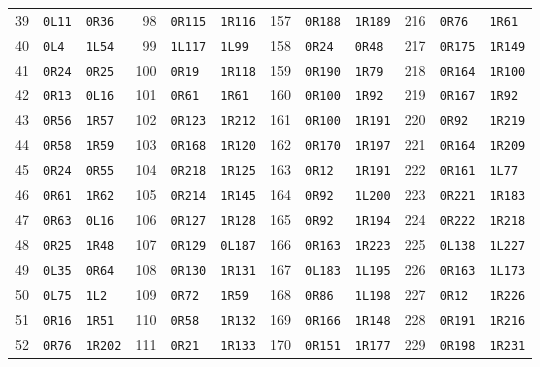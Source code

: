 \begin{longtable}{rllrllrllrll}
39 & \texttt{0L11} & \texttt{0R36} & 98 & \texttt{0R115} & \texttt{1R116} & 157 & \texttt{0R188} & \texttt{1R189} & 216 & \texttt{0R76} & \texttt{1R61}\\
40 & \texttt{0L4} & \texttt{1L54} & 99 & \texttt{1L117} & \texttt{1L99} & 158 & \texttt{0R24} & \texttt{0R48} & 217 & \texttt{0R175} & \texttt{1R149}\\
41 & \texttt{0R24} & \texttt{0R25} & 100 & \texttt{0R19} & \texttt{1R118} & 159 & \texttt{0R190} & \texttt{1R79} & 218 & \texttt{0R164} & \texttt{1R100}\\
42 & \texttt{0R13} & \texttt{0L16} & 101 & \texttt{0R61} & \texttt{1R61} & 160 & \texttt{0R100} & \texttt{1R92} & 219 & \texttt{0R167} & \texttt{1R92}\\
43 & \texttt{0R56} & \texttt{1R57} & 102 & \texttt{0R123} & \texttt{1R212} & 161 & \texttt{0R100} & \texttt{1R191} & 220 & \texttt{0R92} & \texttt{1R219}\\
44 & \texttt{0R58} & \texttt{1R59} & 103 & \texttt{0R168} & \texttt{1R120} & 162 & \texttt{0R170} & \texttt{1R197} & 221 & \texttt{0R164} & \texttt{1R209}\\
45 & \texttt{0R24} & \texttt{0R55} & 104 & \texttt{0R218} & \texttt{1R125} & 163 & \texttt{0R12} & \texttt{1R191} & 222 & \texttt{0R161} & \texttt{1L77}\\
46 & \texttt{0R61} & \texttt{1R62} & 105 & \texttt{0R214} & \texttt{1R145} & 164 & \texttt{0R92} & \texttt{1L200} & 223 & \texttt{0R221} & \texttt{1R183}\\
47 & \texttt{0R63} & \texttt{0L16} & 106 & \texttt{0R127} & \texttt{1R128} & 165 & \texttt{0R92} & \texttt{1R194} & 224 & \texttt{0R222} & \texttt{1R218}\\
48 & \texttt{0R25} & \texttt{1R48} & 107 & \texttt{0R129} & \texttt{0L187} & 166 & \texttt{0R163} & \texttt{1R223} & 225 & \texttt{0L138} & \texttt{1L227}\\
49 & \texttt{0L35} & \texttt{0R64} & 108 & \texttt{0R130} & \texttt{1R131} & 167 & \texttt{0L183} & \texttt{1L195} & 226 & \texttt{0R163} & \texttt{1L173}\\
50 & \texttt{0L75} & \texttt{1L2} & 109 & \texttt{0R72} & \texttt{1R59} & 168 & \texttt{0R86} & \texttt{1L198} & 227 & \texttt{0R12} & \texttt{1R226}\\
51 & \texttt{0R16} & \texttt{1R51} & 110 & \texttt{0R58} & \texttt{1R132} & 169 & \texttt{0R166} & \texttt{1R148} & 228 & \texttt{0R191} & \texttt{1R216}\\
52 & \texttt{0R76} & \texttt{1R202} & 111 & \texttt{0R21} & \texttt{1R133} & 170 & \texttt{0R151} & \texttt{1R177} & 229 & \texttt{0R198} & \texttt{1R231}\\

\end{longtable}
